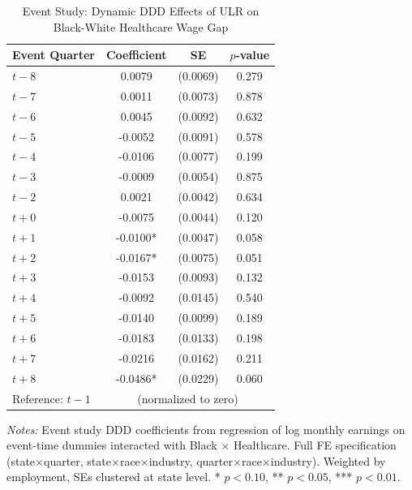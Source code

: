 \begin{table}[t]
\centering
\caption{Event Study: Dynamic DDD Effects of ULR on Black-White Healthcare Wage Gap}
\label{tab:eventstudy}
\begin{threeparttable}
\begin{tabular}{lccc}
\toprule
Event Quarter & Coefficient & SE & $p$-value \\
\midrule
$t  -8$ & 0.0079 & (0.0069) & 0.279 \\
$t  -7$ & 0.0011 & (0.0073) & 0.878 \\
$t  -6$ & 0.0045 & (0.0092) & 0.632 \\
$t  -5$ & -0.0052 & (0.0091) & 0.578 \\
$t  -4$ & -0.0106 & (0.0077) & 0.199 \\
$t  -3$ & -0.0009 & (0.0054) & 0.875 \\
$t  -2$ & 0.0021 & (0.0042) & 0.634 \\
$t + 0$ & -0.0075 & (0.0044) & 0.120 \\
$t + 1$ & -0.0100* & (0.0047) & 0.058 \\
$t + 2$ & -0.0167* & (0.0075) & 0.051 \\
$t + 3$ & -0.0153 & (0.0093) & 0.132 \\
$t + 4$ & -0.0092 & (0.0145) & 0.540 \\
$t + 5$ & -0.0140 & (0.0099) & 0.189 \\
$t + 6$ & -0.0183 & (0.0133) & 0.198 \\
$t + 7$ & -0.0216 & (0.0162) & 0.211 \\
$t + 8$ & -0.0486* & (0.0229) & 0.060 \\
\midrule
Reference: $t - 1$ & \multicolumn{3}{c}{(normalized to zero)} \\
\bottomrule
\end{tabular}
\begin{tablenotes}[flushleft]\small
\item \textit{Notes:} Event study DDD coefficients from regression of log monthly earnings on event-time dummies interacted with Black $\times$ Healthcare. Full FE specification (state$\times$quarter, state$\times$race$\times$industry, quarter$\times$race$\times$industry). Weighted by employment, SEs clustered at state level. * $p<0.10$, ** $p<0.05$, *** $p<0.01$.
\end{tablenotes}
\end{threeparttable}
\end{table}

